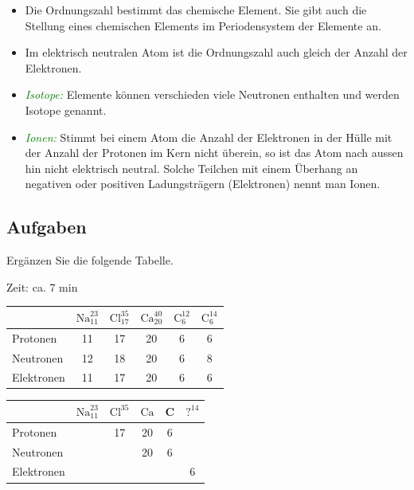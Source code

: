 	\begin{itemize}%
		\item Die Ordnungszahl bestimmt das chemische Element. Sie gibt auch die Stellung eines chemischen Elements im Periodensystem der Elemente an.
		\item Im elektrisch neutralen Atom ist die Ordnungszahl auch gleich der Anzahl der Elektronen.
		\item \textcolor{green}{\textit{Isotope: }}Elemente können verschieden viele Neutronen enthalten und werden Isotope genannt.
		\item \textcolor{green}{\textit{Ionen:}} Stimmt bei einem Atom die Anzahl der Elektronen in der Hülle mit der Anzahl der Protonen im Kern nicht überein, so ist das Atom nach aussen hin nicht elektrisch neutral. Solche Teilchen mit einem Überhang an negativen oder positiven Ladungsträgern (Elektronen) nennt man Ionen.
	\end{itemize}
	
	
	\subsection*{Aufgaben}
	Ergänzen Sie die folgende Tabelle. 
	
	Zeit: ca. 7 min
	
	\ifprintanswers
	\begin{table}[H]
		\centering
		\begin{tabular}{|l|c|c|c|c|c|}
			\hline            & $\mathrm{Na}_{11}^{23}$ & $\mathrm{Cl}_{17}^{35}$ & $\mathrm{Ca}_{20}^{40}$ & $\mathrm{C}_{6}^{12}$ & $\mathrm{C}_{6}^{14}$ \\
			\hline Protonen   & 11                      & 17                      & 20                      & 6                     & 6                     \\
			\hline Neutronen  & 12                      & 18                      & 20                      & 6                     & 8                     \\
			\hline Elektronen & 11                      & 17                      & 20                      & 6                     & 6                     \\
			\hline
		\end{tabular}
	\end{table}
	\else
	
	\begin{table}[H]
	\fortyptfont
		\centering
		\begin{tabular}{|l|c|c|c|c|c|}
			\hline            & $\mathrm{Na}_{11}^{23}$ & $\mathrm{Cl}^{35}$ & $\mathrm{Ca}$ & C & $?^{14}$ \\
			\hline Protonen   &                         & 17                 & 20            & 6 &          \\
			\hline Neutronen  &                         &                    & 20            & 6 &          \\
			\hline Elektronen &                         &                    &               &   & 6        \\
			\hline
		\end{tabular}
	\end{table}
	\fi
	
	
	
	

